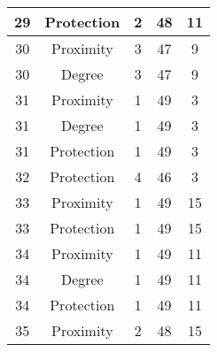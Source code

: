 \documentclass[results.tex]{subfiles}
\begin{document}
\begin{center}
\begin{tabular}{| c || c | c | c | c |}
            \hline
            29                      & Protection                   & 2                      & 48                      & 11                   \\
            \hline
            30                      & Proximity                    & 3                      & 47                      & 9                    \\
            \hline
            30                      & Degree                       & 3                      & 47                      & 9                    \\
            \hline
            31                      & Proximity                    & 1                      & 49                      & 3                    \\
            \hline
            31                      & Degree                       & 1                      & 49                      & 3                    \\
            \hline
            31                      & Protection                   & 1                      & 49                      & 3                    \\
            \hline
            32                      & Protection                   & 4                      & 46                      & 3                    \\
            \hline
            33                      & Proximity                    & 1                      & 49                      & 15                   \\
            \hline
            33                      & Protection                   & 1                      & 49                      & 15                   \\
            \hline
            34                      & Proximity                    & 1                      & 49                      & 11                   \\
            \hline
            34                      & Degree                       & 1                      & 49                      & 11                   \\
            \hline
            34                      & Protection                   & 1                      & 49                      & 11                   \\
            \hline
            35                      & Proximity                    & 2                      & 48                      & 15                   \\

\end{tabular}
\end{center}
\end{document}

